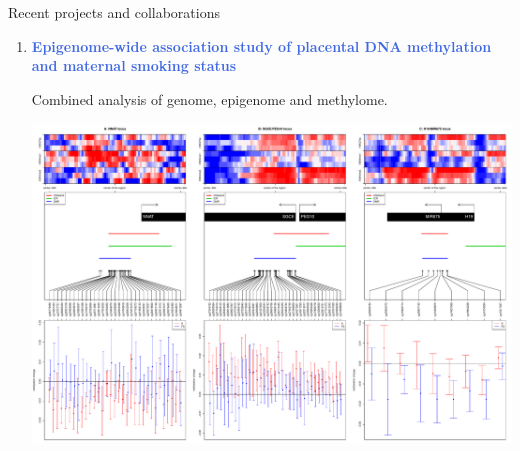 \documentclass[final]{beamer}
\newlength{\twocolwid}
\begin{document}
\begin{frame}[t]
\begin{columns}[t]
\begin{column}{\twocolwid}
\begin{block}{Recent projects and collaborations}
\begin{enumerate}
\item \textcolor{RoyalBlue}{\textbf{Epigenome-wide association study of placental DNA methylation and maternal smoking status}}

Combined analysis of genome, epigenome and methylome.

\begin{center}
	\includegraphics[width=0.95\linewidth]{figs/fig_3loci}
\end{center}


\end{enumerate}

\end{block}






\end{column}
\end{columns}
\end{frame}
\end{document}
